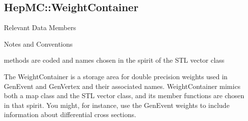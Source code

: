 \documentclass[11pt,letterpaper]{article}
\begin{document}
%
%

\subsection{HepMC::WeightContainer}
\begin{myitemize}{Relevant Data Members}
\end{myitemize}
\begin{myitemize}{Notes and Conventions}
\item methods are coded and names chosen in the spirit of the
  STL vector class
\end{myitemize}

The WeightContainer is a storage area for double precision
weights used in GenEvent and GenVertex and their associated names. 
WeightContainer mimics both a map class and the STL vector class, 
and its member functions are chosen in that spirit.  
You might, for instance, use the GenEvent weights to include
information about differential cross sections.

%
%
\end{document}
